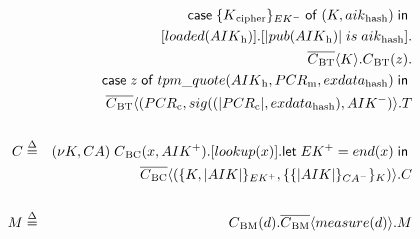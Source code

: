 \documentclass[12pt]{report}
\begin{document}
\begin{eqnarray*}
  & & \ccase{\decrypt{\k\textsubscript{cipher}}{EK}}{(\k, aik\textsubscript{hash})}{} \\  %
  & & [loaded(\aikh)] . [\hash{pub(\aikh)}\; is \; aik\textsubscript{hash}] . \\
  & & \snd{\channel{\att \tp}}{\k} . \rcv{\channel{\att \tp}}{z} . \\
  & & \tcase{z}{tpm\_quote(\aikh, \pmask, exdata\textsubscript{hash})} \\
  & & \snd{\channel{\att \tp}}{(\pcomp, sig((\hash{\pcomp}, exdata\textsubscript{hash}), \private{AIK})} .\tp
\\
\\
  \ca & \defs & \bind{\k, CA} \rcv{\channel{\att \ca}}{x, \public{AIK}} . [lookup(x)] . \llet{\public{EK}} {end(x)}{} \\
  & & \snd{\channel{\att \ca}}{(\encrypt{\k, \hash{AIK}}{EK}, \crypt{\sign{AIK}{CA}}{\k})} . \ca
\\
\\
  \mea & \defs & \rcv{\channel{\att \mea}}{d} . \snd{\channel{\att \mea}}{measure(d)} . \mea
\end{eqnarray*}
\end{document}
